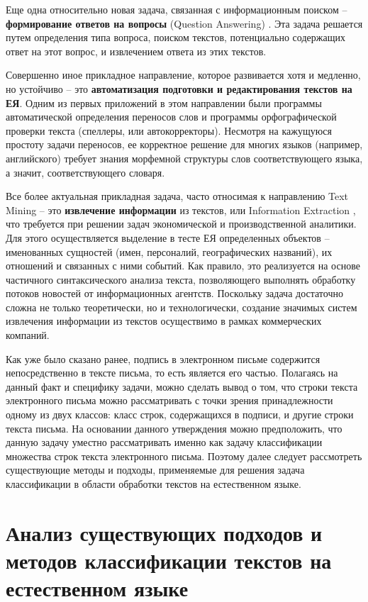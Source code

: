 Еще одна относительно новая задача, связанная с информационным поиском – \textbf{формирование ответов на вопросы} (Question Answering) \cite{qa}. Эта задача решается путем определения типа вопроса, поиском текстов, потенциально содержащих ответ на этот вопрос, и извлечением ответа из этих текстов.

Совершенно иное прикладное направление, которое развивается хотя и медленно, но устойчиво – это \textbf{автоматизация подготовки и редактирования
текстов на ЕЯ}. Одним из первых приложений в этом направлении были программы автоматической определения переносов слов и программы орфографической проверки текста (спеллеры, или автокорректоры). Несмотря на кажущуюся простоту задачи переносов, ее корректное решение для многих языков (например, английского) требует знания морфемной структуры слов соответствующего языка, а значит, соответствующего словаря.

Все более актуальная прикладная задача, часто относимая к направлению Text Mining – это \textbf{извлечение информации} из текстов, или Information Extraction \cite{information-extraction}, что требуется при решении задач экономической и производственной аналитики. Для
этого осуществляется выделение в тесте ЕЯ определенных объектов – именованных сущностей (имен, персоналий, географических названий), их отношений и связанных
с ними событий. Как правило, это реализуется на основе частичного синтаксического анализа текста, позволяющего выполнять обработку потоков новостей от информационных агентств. Поскольку задача достаточно сложна не только
теоретически, но и технологически, создание значимых систем извлечения информации из текстов осуществимо в рамках коммерческих компаний.


Как уже было сказано ранее, подпись в электронном письме содержится непосредственно в тексте письма, то есть является его частью. Полагаясь на данный факт и специфику задачи, можно сделать вывод о том, что строки текста электронного письма можно рассматривать с точки зрения принадлежности одному из двух классов: класс строк, содержащихся в подписи, и другие строки текста письма. На основании данного утверждения можно предположить, что данную задачу уместно рассматривать именно как задачу классификации множества строк текста электронного письма.
Поэтому далее следует рассмотреть существующие методы и подходы, применяемые для решения задача классификации в области обработки текстов на естественном языке. 

\newpage
\section{Анализ существующих подходов и методов классификации текстов на естественном языке}

